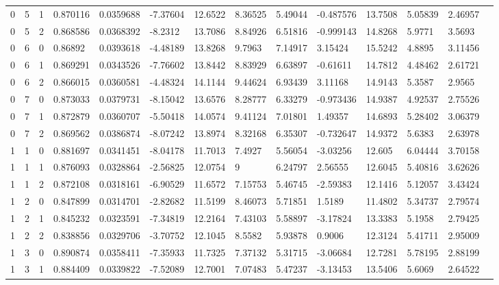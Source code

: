\documentclass[main.tex]{subfiles}
\begin{document}
\begin{table}
{\begin{tabular}{llllllllllllll}
      0 & 5 & 1 &   0.870116 & 0.0359688 & -7.37604 & 12.6522 & 8.36525 & 5.49044 & -0.487576 & 13.7508 & 5.05839 & 2.46957 \\
      0 & 5 & 2 &   0.868586 & 0.0368392 & -8.2312 & 13.7086 & 8.84926 & 6.51816 & -0.999143 & 14.8268 & 5.9771 & 3.5693 \\
      0 & 6 & 0 &   0.86892 & 0.0393618 & -4.48189 & 13.8268 & 9.7963 & 7.14917 & 3.15424 & 15.5242 & 4.8895 & 3.11456 \\
      0 & 6 & 1 &   0.869291 & 0.0343526 & -7.76602 & 13.8442 & 8.83929 & 6.63897 & -0.61611 & 14.7812 & 4.48462 & 2.61721 \\
      0 & 6 & 2 &   0.866015 & 0.0360581 & -4.48324 & 14.1144 & 9.44624 & 6.93439 & 3.11168 & 14.9143 & 5.3587 & 2.9565 \\
      0 & 7 & 0 &   0.873033 & 0.0379731 & -8.15042 & 13.6576 & 8.28777 & 6.33279 & -0.973436 & 14.9387 & 4.92537 & 2.75526 \\
      0 & 7 & 1 &   0.872879 & 0.0360707 & -5.50418 & 14.0574 & 9.41124 & 7.01801 & 1.49357 & 14.6893 & 5.28402 & 3.06379 \\
      0 & 7 & 2 &   0.869562 & 0.0386874 & -8.07242 & 13.8974 & 8.32168 & 6.35307 & -0.732647 & 14.9372 & 5.6383 & 2.63978 \\
      1 & 1 & 0 &   0.881697 & 0.0341451 & -8.04178 & 11.7013 & 7.4927 & 5.56054 & -3.03256 & 12.605 & 6.04444 & 3.70158 \\
      1 & 1 & 1 &   0.876093 & 0.0328864 & -2.56825 & 12.0754 & 9 & 6.24797 & 2.56555 & 12.6045 & 5.40816 & 3.62626 \\
      1 & 1 & 2 &   0.872108 & 0.0318161 & -6.90529 & 11.6572 & 7.15753 & 5.46745 & -2.59383 & 12.1416 & 5.12057 & 3.43424 \\
      1 & 2 & 0 &   0.847899 & 0.0314701 & -2.82682 & 11.5199 & 8.46073 & 5.71851 & 1.5189 & 11.4802 & 5.34737 & 2.79574 \\
      1 & 2 & 1 &   0.845232 & 0.0323591 & -7.34819 & 12.2164 & 7.43103 & 5.58897 & -3.17824 & 13.3383 & 5.1958 & 2.79425 \\
      1 & 2 & 2 &   0.838856 & 0.0329706 & -3.70752 & 12.1045 & 8.5582 & 5.93878 & 0.9006 & 12.3124 & 5.41711 & 2.95009 \\
      1 & 3 & 0 &   0.890874 & 0.0358411 & -7.35933 & 11.7325 & 7.37132 & 5.31715 & -3.06684 & 12.7281 & 5.78195 & 2.88199 \\
      1 & 3 & 1 &   0.884409 & 0.0339822 & -7.52089 & 12.7001 & 7.07483 & 5.47237 & -3.13453 & 13.5406 & 5.6069 & 2.64522 \\

\end{tabular}}
\end{table}
\end{document}

